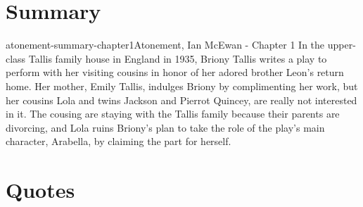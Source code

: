 \documentclass[preview]{standalone}
\begin{document}
\genpage

\section{Summary}

\begin{snippetsummary}{atonement-summary-chapter1}{Atonement, Ian McEwan - Chapter 1}
    In the upper-class Tallis family house in England in 1935,
    Briony Tallis writes a play to perform with her visiting
    cousins in honor of her adored brother Leon's return home.
    Her mother, Emily Tallis, indulges Briony by complimenting her work,
    but her cousins Lola and twins Jackson and Pierrot Quincey, are really
    not interested in it. The cousing are staying with the Tallis family
    because their parents are divorcing, and Lola ruins
    Briony's plan to take the role of the play's main character, Arabella, by
    claiming the part for herself.
\end{snippetsummary}

\section{Quotes}
\end{document}
